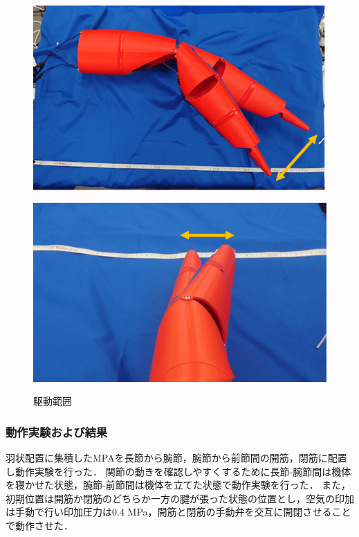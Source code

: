 %
\begin{figure}[t]
  \begin{minipage}{0.5\hsize}
    \centering
    \includegraphics[scale=0.15]{image/kousatu2_1.png}
    \label{fig:kousatu2_1}
  \end{minipage}
  \begin{minipage}{0.5\hsize}
    \centering
    \includegraphics[scale=0.15]{image/kousatu2_2.png}
    \label{fig:kousatu2_2}
  \end{minipage}
  \caption{駆動範囲}
  \label{fig:kousatu2}
\end{figure}
\subsubsection{動作実験および結果}
羽状配置に集積したMPAを長節から腕節，腕節から前節間の開筋，閉筋に配置し動作実験を行った．
関節の動きを確認しやすくするために長節-腕節間は機体を寝かせた状態，腕節-前節間は機体を立てた状態で動作実験を行った．
また，初期位置は開筋か閉筋のどちらか一方の腱が張った状態の位置とし，空気の印加は手動で行い印加圧力は0.4 MPa，開筋と閉筋の手動弁を交互に開閉させることで動作させた．

